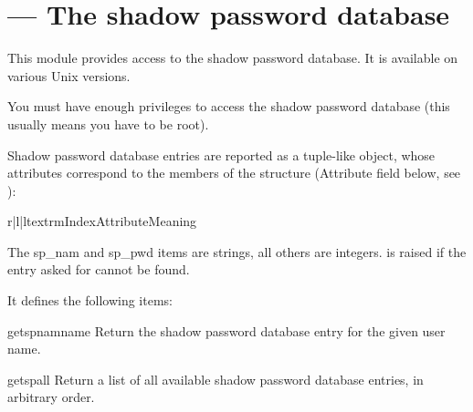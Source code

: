 \section{ ---
         The shadow password database}


This module provides access to the \UNIX{} shadow password database.
It is available on various Unix versions.

You must have enough privileges to access the shadow password database
(this usually means you have to be root).

Shadow password database entries are reported as a tuple-like object, whose
attributes correspond to the members of the  structure
(Attribute field below, see ):

\begin{tableiii}{r|l|l}{textrm}{Index}{Attribute}{Meaning}
\end{tableiii}

The sp_nam and sp_pwd items are strings, all others are integers.
 is raised if the entry asked for cannot be found.

It defines the following items:

\begin{funcdesc}{getspnam}{name}
Return the shadow password database entry for the given user name.
\end{funcdesc}

\begin{funcdesc}{getspall}{}
Return a list of all available shadow password database entries, in arbitrary order.
\end{funcdesc}


\begin{seealso}
\end{seealso}
